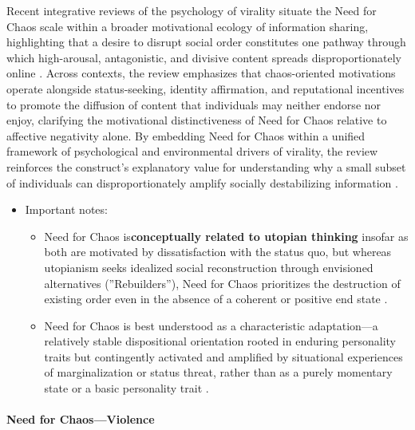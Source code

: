 \documentclass[jou,floatsintext]{apa7}
\begin{document}
Recent integrative reviews of the psychology of virality situate the Need for Chaos scale within a broader motivational ecology of information sharing, highlighting that a desire to disrupt social order constitutes one pathway through which high-arousal, antagonistic, and divisive content spreads disproportionately online \parencite{rathjePsychologyVirality2025}. Across contexts, the review emphasizes that chaos-oriented motivations operate alongside status-seeking, identity affirmation, and reputational incentives to promote the diffusion of content that individuals may neither endorse nor enjoy, clarifying the motivational distinctiveness of Need for Chaos relative to affective negativity alone. By embedding Need for Chaos within a unified framework of psychological and environmental drivers of virality, the review reinforces the construct’s explanatory value for understanding why a small subset of individuals can disproportionately amplify socially destabilizing information \parencite{rathjePsychologyVirality2025}.

\begin{itemize}
    \item Important notes:
    \begin{itemize}
        \item  Need for Chaos is\textbf{conceptually related to utopian thinking} insofar as both are motivated by dissatisfaction with the status quo, but whereas utopianism seeks idealized social reconstruction through envisioned alternatives (''Rebuilders''), Need for Chaos prioritizes the destruction of existing order even in the absence of a coherent or positive end state \parencite{arceneauxPeopleJustWant2021}.
        \item Need for Chaos is best understood as a characteristic adaptation---a relatively stable dispositional orientation rooted in enduring personality traits but contingently activated and amplified by situational experiences of marginalization or status threat, rather than as a purely momentary state or a basic personality trait \parencite{arceneauxPeopleJustWant2021}. 
    \end{itemize}
\end{itemize}


\paragraph{Need for Chaos---Violence}
\end{document}
